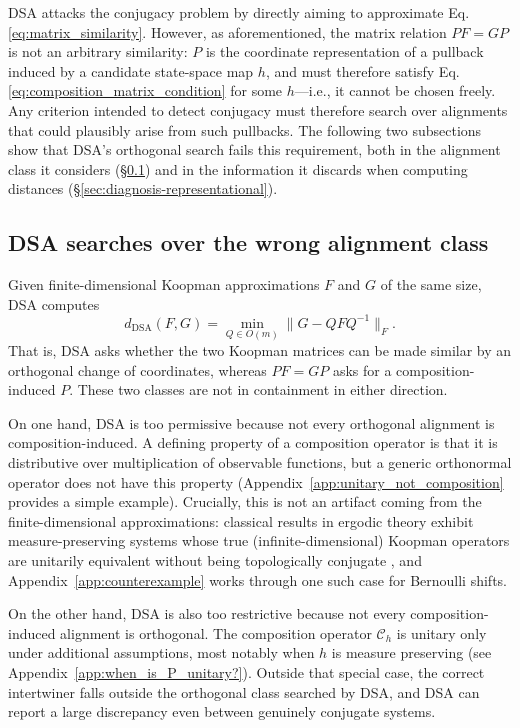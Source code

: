 \documentclass{article}
\theoremstyle{definition}
\begin{document}
DSA attacks the conjugacy problem by directly aiming to approximate Eq. \eqref{eq:matrix_similarity}. However, as aforementioned, the matrix relation \(PF = GP\) is not an arbitrary similarity: \(P\) is the coordinate representation of a pullback induced by a candidate state-space map \(h\), and must therefore satisfy Eq. \eqref{eq:composition_matrix_condition} for some $h$---i.e., it cannot be chosen freely. Any criterion intended to detect conjugacy must therefore search over alignments that could plausibly arise from such pullbacks. The following two subsections show that DSA's orthogonal search fails this requirement, both in the alignment class it considers (\S\ref{sec:diagnosis-dsa-mismatch}) and in the information it discards when computing distances (\S\ref{sec:diagnosis-representational}).

\subsection{DSA searches over the wrong alignment class}
\label{sec:diagnosis-dsa-mismatch}

Given finite-dimensional Koopman approximations \(F\) and \(G\) of the same size, DSA computes
\begin{equation}
\label{eq:dsa_distance}
    d_{\mathrm{DSA}}(F,G)
    =
    \min_{Q\in O(m)}
    \|G-QFQ^{-1}\|_F .
\end{equation}
That is, DSA asks whether the two Koopman matrices can be made similar by an orthogonal change of coordinates, whereas \(PF=GP\) asks for a composition-induced \(P\). These two classes are not in containment in either direction.

On one hand, DSA is too permissive because not every orthogonal alignment is composition-induced. A defining property of a composition operator is that it is distributive over multiplication of observable functions, but a generic orthonormal operator does not have this property (Appendix~\ref{app:unitary_not_composition} provides a simple example). Crucially, this is not an artifact coming from the finite-dimensional approximations: classical results in ergodic theory exhibit measure-preserving systems whose true (infinite-dimensional) Koopman operators are unitarily equivalent without being topologically conjugate \citep{redei2012history}, and Appendix~\ref{app:counterexample} works through one such case for Bernoulli shifts. 

On the other hand, DSA is also too restrictive because not every composition-induced alignment is orthogonal. The composition operator \(\mathcal C_h\) is unitary only under additional assumptions, most notably when \(h\) is measure preserving \citep{budivsic2012applied} (see Appendix~\ref{app:when_is_P_unitary?}). Outside that special case, the correct intertwiner falls outside the orthogonal class searched by DSA, and DSA can report a large discrepancy even between genuinely conjugate systems.
\end{document}
